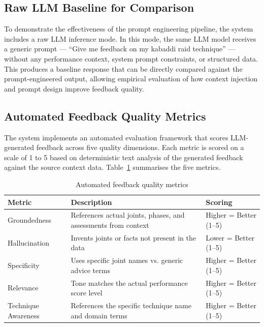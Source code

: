 \subsection{Raw LLM Baseline for Comparison}

To demonstrate the effectiveness of the prompt engineering pipeline, the system includes a raw LLM inference mode. In this mode, the same LLM model receives a generic prompt --- ``Give me feedback on my kabaddi raid technique'' --- without any performance context, system prompt constraints, or structured data. This produces a baseline response that can be directly compared against the prompt-engineered output, allowing empirical evaluation of how context injection and prompt design improve feedback quality.


\subsection{Automated Feedback Quality Metrics}

The system implements an automated evaluation framework that scores LLM-generated feedback across five quality dimensions. Each metric is scored on a scale of 1 to 5 based on deterministic text analysis of the generated feedback against the source context data. Table~\ref{tab:feedback_metrics} summarises the five metrics.

\begin{table}[htbp]
\centering
\small
\caption{Automated feedback quality metrics}
\label{tab:feedback_metrics}
\setlength{\tabcolsep}{4pt}
\begin{tabular}{|>{\raggedright\arraybackslash}p{3.2cm}|>{\raggedright\arraybackslash}p{6.2cm}|>{\raggedright\arraybackslash}p{3.0cm}|}
\hline
\textbf{Metric} & \textbf{Description} & \textbf{Scoring} \\
\hline
Groundedness & References actual joints, phases, and assessments from context & Higher = Better (1--5) \\
\hline
Hallucination & Invents joints or facts not present in the data & Lower = Better (1--5) \\
\hline
Specificity & Uses specific joint names vs. generic advice terms & Higher = Better (1--5) \\
\hline
Relevance & Tone matches the actual performance score level & Higher = Better (1--5) \\
\hline
Technique Awareness & References the specific technique name and domain terms & Higher = Better (1--5) \\
\hline
\end{tabular}
\end{table}



